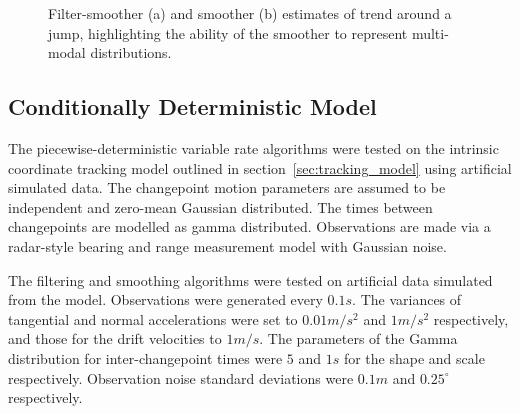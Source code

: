 \documentclass[10pt,twocolumn,twoside]{IEEEtran}
\begin{document}
\begin{figure}[!t]
\centering
{}
\caption{Filter-smoother (a) and smoother (b) estimates of trend around a jump, highlighting the ability of the smoother to represent multi-modal distributions.}
\label{fig:finance_multimodality}
\end{figure}



\subsection{Conditionally Deterministic Model}

The piecewise-deterministic variable rate algorithms were tested on the intrinsic coordinate tracking model outlined in section~\ref{sec:tracking_model} using artificial simulated data. The changepoint motion parameters are assumed to be independent and zero-mean Gaussian distributed. The times between changepoints are modelled as gamma distributed. Observations are made via a radar-style bearing and range measurement model with Gaussian noise.

The filtering and smoothing algorithms were tested on artificial data simulated from the model. Observations were generated every $0.1s$. The variances of tangential and normal accelerations were set to $0.01m/s^2$ and $1m/s^2$ respectively, and those for the drift velocities to $1m/s$. The parameters of the Gamma distribution for inter-changepoint times were $5$ and $1s$ for the shape and scale respectively. Observation noise standard deviations were $0.1m$ and $0.25^{\circ}$ respectively.
\end{document}
